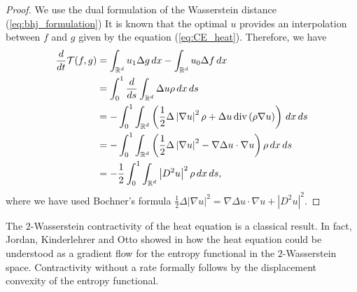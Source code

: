 \documentclass[11pt]{amsart}
\numberwithin{equation}{section}
\begin{document}
\begin{proof}
  We use the dual formulation of the Wasserstein distance (\ref{eq:bhj_formulation}) 
  It is known that the optimal $u$ provides an interpolation between $f$ and $g$ given by the equation (\ref{eq:CE_heat}). Therefore, we have
  \begin{align*}
    \frac{d}{dt}\mathcal{T}(f,g) &
    =\int_{\mathbb{R}^{d}}u_{1}\Delta g\,dx-\int_{\mathbb{R}^{d}}u_{0}\Delta f\,dx	\\
    &=\int_{0}^{1}\frac{d}{ds}\int_{\mathbb{R}^{d}}\Delta u\rho\,dx\,ds \\
    & =-\int_{0}^{1}\int_{\mathbb{R}^{d}}\left(\frac{1}{2}\Delta\left|\nabla u\right|^{2}\rho+\Delta u\,\textnormal{div}\left(\rho\nabla u\right)\right)\,dx\, ds\\
    & =-\int_{0}^{1}\int_{\mathbb{R}^{d}}\left(\frac{1}{2}\Delta\left|\nabla u\right|^{2}-\nabla\Delta u\cdot\nabla u\right)\rho\,dx\, ds\\
    & =-\frac{1}{2}\int_{0}^{1}\int_{\mathbb{R}^{d}}\left|D^{2}u\right|^{2}\rho\,dx\,ds,
  \end{align*}
  where we have used Bochner's formula $\frac{1}{2}\Delta\left|\nabla u\right|^{2}=\nabla\Delta u\cdot\nabla u+\left|D^{2}u\right|^{2}$.
\end{proof}

The $2$-Wasserstein contractivity of the heat equation is a classical result. In fact, Jordan, Kinderlehrer and Otto showed in \cite{JKO1998FokkerPlanck} how the heat equation could be understood as a gradient flow for the entropy functional in the $2$-Wasserstein space. Contractivity without a rate formally follows by the displacement convexity of the entropy functional. 
\end{document}
